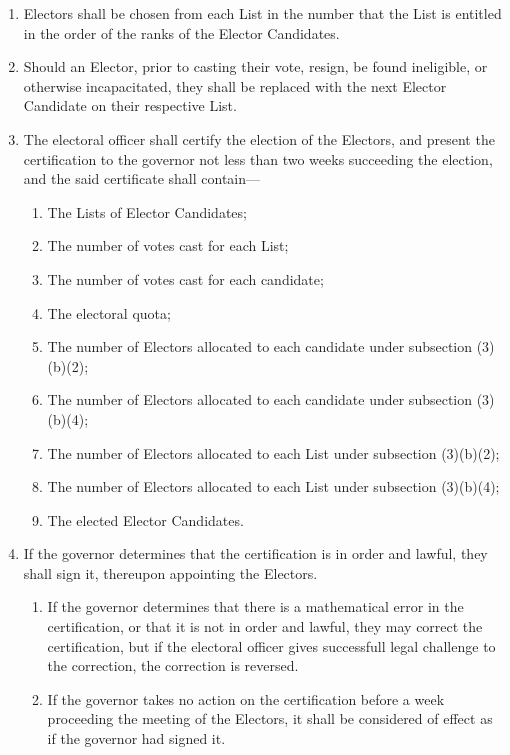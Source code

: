 \documentclass{article}
\begin{document}
    \begin{enumerate}
        \item Electors shall be chosen from each List in the number that the List is entitled in the order of the ranks of the Elector Candidates.
        \item Should an Elector, prior to casting their vote, resign, be found ineligible, or otherwise incapacitated, they shall be replaced with the next Elector Candidate on their respective List.
        \item The electoral officer shall certify the election of the Electors, and present the certification to the governor not less than two weeks succeeding the election, and the said certificate shall contain---
        \begin{enumerate}
            \item The Lists of Elector Candidates;
            \item The number of votes cast for each List;
            \item The number of votes cast for each candidate;
            \item The electoral quota;
            \item The number of Electors allocated to each candidate under subsection (3)(b)(2);
            \item The number of Electors allocated to each candidate under subsection (3)(b)(4);
            \item The number of Electors allocated to each List under subsection (3)(b)(2);
            \item The number of Electors allocated to each List under subsection (3)(b)(4);
            \item The elected Elector Candidates.
        \end{enumerate}
        \item If the governor determines that the certification is in order and lawful, they shall sign it, thereupon appointing the Electors.
        \begin{enumerate}
            \item If the governor determines that there is a mathematical error in the certification, or that it is not in order and lawful, they may correct the certification, but if the electoral officer gives successfull legal challenge to the correction, the correction is reversed.
            \item If the governor takes no action on the certification before a week proceeding the meeting of the Electors, it shall be considered of effect as if the governor had signed it. 
        \end{enumerate}
    \end{enumerate}
\end{document}
